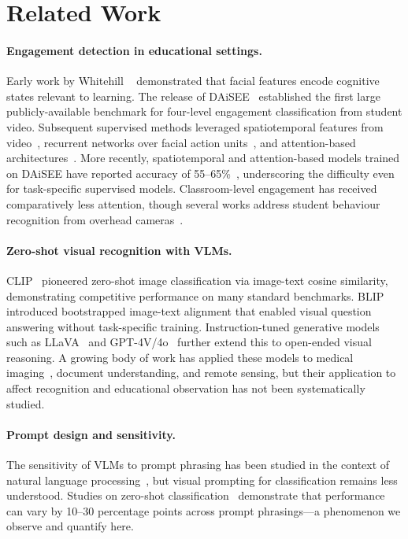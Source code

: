 \section{Related Work}
\label{sec:related}

\paragraph{Engagement detection in educational settings.}
Early work by Whitehill \etal~\cite{whitehill2014faces} demonstrated
that facial features encode cognitive states relevant to learning.
The release of DAiSEE~\cite{gupta2016daisee} established the first large
publicly-available benchmark for four-level engagement classification
from student video.  Subsequent supervised methods leveraged spatiotemporal
features from video~\cite{liao2021deep}, recurrent networks over facial
action units~\cite{thomas2018predicting}, and attention-based
architectures~\cite{huang2019fine}.  More recently, spatiotemporal and attention-based
models trained on DAiSEE have reported accuracy of 55--65\%~\cite{liao2021deep,huang2019fine}, underscoring
the difficulty even for task-specific supervised models.
Classroom-level engagement has received comparatively less attention,
though several works address student behaviour recognition from overhead
cameras~\cite{wang2023scb,kaur2018classroom}.

\paragraph{Zero-shot visual recognition with VLMs.}
CLIP~\cite{radford2021learning} pioneered zero-shot image classification
via image-text cosine similarity, demonstrating competitive performance
on many standard benchmarks.  BLIP~\cite{li2022blip} introduced
bootstrapped image-text alignment that enabled visual question answering
without task-specific training.  Instruction-tuned generative models
such as LLaVA~\cite{liu2023visual} and GPT-4V/4o~\cite{openai2024gpt4o}
further extend this to open-ended visual reasoning.  A growing body of
work has applied these models to medical imaging~\cite{zhang2023pmc},
document understanding, and remote sensing, but their application to
affect recognition and educational observation has not been
systematically studied.

\paragraph{Prompt design and sensitivity.}
The sensitivity of VLMs to prompt phrasing has been studied in the
context of natural language processing~\cite{zhao2021calibrate,
lu2022fantastically}, but visual prompting for classification remains
less understood.  Studies on zero-shot classification~\cite{menon2022visual}
demonstrate that performance can vary by 10--30 percentage points across
prompt phrasings---a phenomenon we observe and quantify here.
